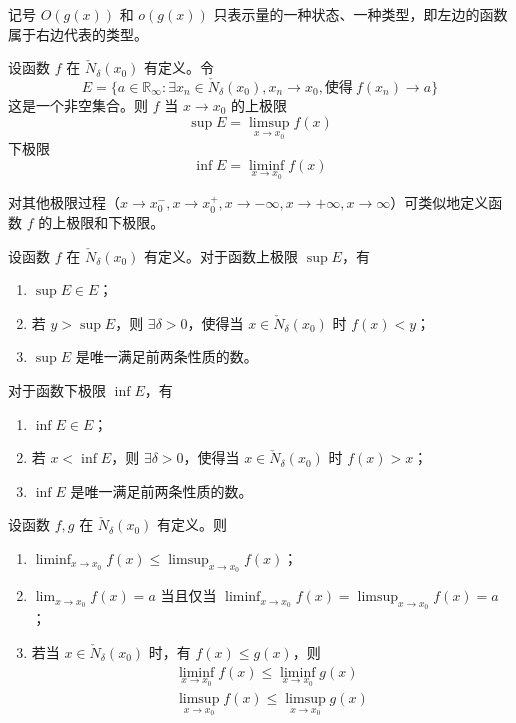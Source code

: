 \begin{remark}
    记号 $O(g(x))$ 和 $o(g(x))$ 只表示量的一种状态、一种类型，即左边的函数属于右边代表的类型。
\end{remark}

\begin{definition}
    设函数 $f$ 在 $\check{N}_{\delta}(x_0)$ 有定义。令
    \[E = \{ a \in \mathbb{R}_{\infty}: \exists x_n \in \check{N}_{\delta}(x_0), x_n \to x_0, \text{使得}\ f(x_n) \to a\}\]
    这是一个非空集合。则 $f$ 当 $x \to x_0$ 的上极限
    \[\sup E = \limsup_{x \to x_0}f(x)\]
    下极限
    \[\inf E = \liminf_{x \to x_0}f(x)\]
\end{definition}

\begin{remark}
    对其他极限过程（$x \to x_{0}^{-}, x \to x_{0}^{+}, x \to -\infty, x \to +\infty, x \to \infty$）可类似地定义函数 $f$ 的上极限和下极限。
\end{remark}

\begin{theorem}
    设函数 $f$ 在 $\check{N}_{\delta}(x_0)$ 有定义。对于函数上极限 $\sup E$，有
    \begin{enumerate}
        \item $\sup E \in E$；
        \item 若 $y > \sup E$，则 $\exists \delta > 0$，使得当 $x \in \check{N}_{\delta}(x_0)$ 时 $f(x) < y$；
        \item $\sup E$ 是唯一满足前两条性质的数。
    \end{enumerate}
    对于函数下极限 $\inf E$，有
    \begin{enumerate}
        \item $\inf E \in E$；
        \item 若 $x < \inf E$，则 $\exists \delta > 0$，使得当 $x \in \check{N}_{\delta}(x_0)$ 时 $f(x) > x$；
        \item $\inf E$ 是唯一满足前两条性质的数。
    \end{enumerate}
\end{theorem}

\begin{theorem}
    设函数 $f, g$ 在 $\check{N}_{\delta}(x_0)$ 有定义。则
    \begin{enumerate}[itemsep=0.5em]
        \item $\displaystyle \liminf_{x \to x_0}f(x) \leqslant \limsup_{x \to x_0}f(x)$；
        \item $\displaystyle \lim_{x \to x_0}f(x) = a$ 当且仅当 $\displaystyle \liminf_{x \to x_0}f(x) = \limsup_{x \to x_0}f(x) = a$；
        \item 若当 $x \in \check{N}_{\delta}(x_0)$ 时，有 $f(x) \leqslant g(x)$，则
              \begin{gather*}
                  \liminf_{x \to x_0}f(x) \leqslant \liminf_{x \to x_0}g(x) \\
                  \limsup_{x \to x_0}f(x) \leqslant \limsup_{x \to x_0}g(x)
              \end{gather*}
    \end{enumerate}
\end{theorem}

